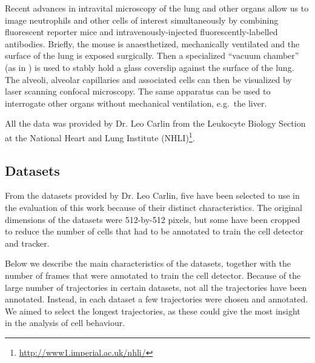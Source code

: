     Recent advances in intravital microscopy of the lung \cite{looney11} and other organs allow us to image neutrophils and other cells of interest simultaneously by combining fluorescent reporter mice and intravenously-injected fluorescently-labelled antibodies. Briefly, the mouse is anaesthetized, mechanically ventilated and the surface of the lung is exposed surgically. Then a specialized ``vacuum chamber'' (as in \cite{looney11}) is used to stably hold a glass coverslip against the surface of the lung. The alveoli, alveolar capillaries and associated cells can then be visualized by laser scanning confocal microscopy. The same apparatus can be used to interrogate other organs without mechanical ventilation, e.g.\ the liver.
        
    All the data was provided by Dr. Leo Carlin from the Leukocyte Biology Section at the National Heart and Lung Institute (NHLI)\footnote{\url{http://www1.imperial.ac.uk/nhli/}}.
    
    \subsection{Datasets}
       
	From the datasets provided by Dr. Leo Carlin, five have been selected to use in the evaluation of this work because of their distinct characteristics. The original dimensions of the datasets were 512-by-512 pixels, but some have been cropped to reduce the number of cells that had to be annotated to train the cell detector and tracker.
	
	Below we describe the main characteristics of the datasets, together with the number of frames that were annotated to train the cell detector. Because of the large number of trajectories in certain datasets, not all the trajectories have been annotated. Instead, in each dataset a few trajectories were chosen and annotated. We aimed to select the longest trajectories, as these could give the most insight in the analysis of cell behaviour.
	

